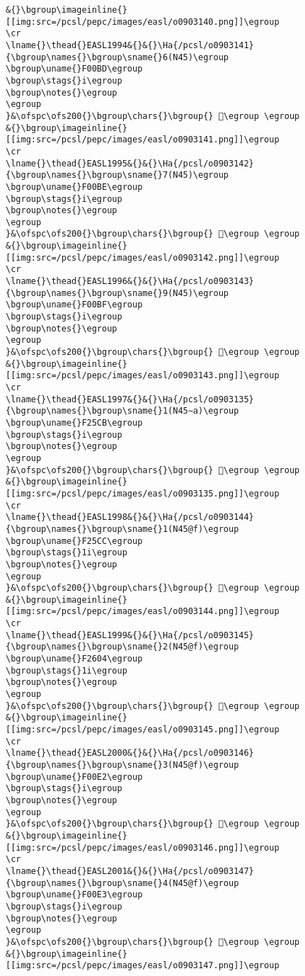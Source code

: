 \begin{verbatim}
&{}\bgroup\imageinline{}[[img:src=/pcsl/pepc/images/easl/o0903140.png]]\egroup
\cr
\lname{}\thead{}EASL1994&{}&{}\Ha{/pcsl/o0903141}{\bgroup\names{}\bgroup\sname{}6(N45)\egroup
\bgroup\uname{}F00BD\egroup
\bgroup\stags{}i\egroup
\bgroup\notes{}\egroup
\egroup
}&\ofspc\ofs200{}\bgroup\chars{}\bgroup{} 󰂽\egroup \egroup
&{}\bgroup\imageinline{}[[img:src=/pcsl/pepc/images/easl/o0903141.png]]\egroup
\cr
\lname{}\thead{}EASL1995&{}&{}\Ha{/pcsl/o0903142}{\bgroup\names{}\bgroup\sname{}7(N45)\egroup
\bgroup\uname{}F00BE\egroup
\bgroup\stags{}i\egroup
\bgroup\notes{}\egroup
\egroup
}&\ofspc\ofs200{}\bgroup\chars{}\bgroup{} 󰂾\egroup \egroup
&{}\bgroup\imageinline{}[[img:src=/pcsl/pepc/images/easl/o0903142.png]]\egroup
\cr
\lname{}\thead{}EASL1996&{}&{}\Ha{/pcsl/o0903143}{\bgroup\names{}\bgroup\sname{}9(N45)\egroup
\bgroup\uname{}F00BF\egroup
\bgroup\stags{}i\egroup
\bgroup\notes{}\egroup
\egroup
}&\ofspc\ofs200{}\bgroup\chars{}\bgroup{} 󰂿\egroup \egroup
&{}\bgroup\imageinline{}[[img:src=/pcsl/pepc/images/easl/o0903143.png]]\egroup
\cr
\lname{}\thead{}EASL1997&{}&{}\Ha{/pcsl/o0903135}{\bgroup\names{}\bgroup\sname{}1(N45∼a)\egroup
\bgroup\uname{}F25CB\egroup
\bgroup\stags{}i\egroup
\bgroup\notes{}\egroup
\egroup
}&\ofspc\ofs200{}\bgroup\chars{}\bgroup{} 󲗋\egroup \egroup
&{}\bgroup\imageinline{}[[img:src=/pcsl/pepc/images/easl/o0903135.png]]\egroup
\cr
\lname{}\thead{}EASL1998&{}&{}\Ha{/pcsl/o0903144}{\bgroup\names{}\bgroup\sname{}1(N45@f)\egroup
\bgroup\uname{}F25CC\egroup
\bgroup\stags{}1i\egroup
\bgroup\notes{}\egroup
\egroup
}&\ofspc\ofs200{}\bgroup\chars{}\bgroup{} 󲗌\egroup \egroup
&{}\bgroup\imageinline{}[[img:src=/pcsl/pepc/images/easl/o0903144.png]]\egroup
\cr
\lname{}\thead{}EASL1999&{}&{}\Ha{/pcsl/o0903145}{\bgroup\names{}\bgroup\sname{}2(N45@f)\egroup
\bgroup\uname{}F2604\egroup
\bgroup\stags{}1i\egroup
\bgroup\notes{}\egroup
\egroup
}&\ofspc\ofs200{}\bgroup\chars{}\bgroup{} 󲘄\egroup \egroup
&{}\bgroup\imageinline{}[[img:src=/pcsl/pepc/images/easl/o0903145.png]]\egroup
\cr
\lname{}\thead{}EASL2000&{}&{}\Ha{/pcsl/o0903146}{\bgroup\names{}\bgroup\sname{}3(N45@f)\egroup
\bgroup\uname{}F00E2\egroup
\bgroup\stags{}i\egroup
\bgroup\notes{}\egroup
\egroup
}&\ofspc\ofs200{}\bgroup\chars{}\bgroup{} 󰃢\egroup \egroup
&{}\bgroup\imageinline{}[[img:src=/pcsl/pepc/images/easl/o0903146.png]]\egroup
\cr
\lname{}\thead{}EASL2001&{}&{}\Ha{/pcsl/o0903147}{\bgroup\names{}\bgroup\sname{}4(N45@f)\egroup
\bgroup\uname{}F00E3\egroup
\bgroup\stags{}i\egroup
\bgroup\notes{}\egroup
\egroup
}&\ofspc\ofs200{}\bgroup\chars{}\bgroup{} 󰃣\egroup \egroup
&{}\bgroup\imageinline{}[[img:src=/pcsl/pepc/images/easl/o0903147.png]]\egroup

\end{verbatim}
